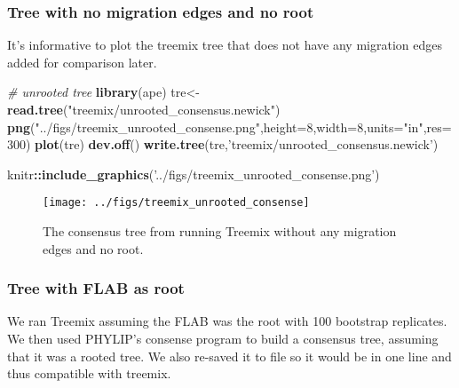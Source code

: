 \documentclass[11pt,]{article}
\newenvironment{Shaded}{\begin{snugshade}}{\end{snugshade}}
\newcommand{\KeywordTok}[1]{\textcolor[rgb]{0.13,0.29,0.53}{\textbf{#1}}}
\newcommand{\DataTypeTok}[1]{\textcolor[rgb]{0.13,0.29,0.53}{#1}}
\newcommand{\DecValTok}[1]{\textcolor[rgb]{0.00,0.00,0.81}{#1}}
\newcommand{\StringTok}[1]{\textcolor[rgb]{0.31,0.60,0.02}{#1}}
\newcommand{\CommentTok}[1]{\textcolor[rgb]{0.56,0.35,0.01}{\textit{#1}}}
\newcommand{\OperatorTok}[1]{\textcolor[rgb]{0.81,0.36,0.00}{\textbf{#1}}}
\newcommand{\NormalTok}[1]{#1}
\begin{document}
\subsubsection{Tree with no migration edges and no
root}\label{tree-with-no-migration-edges-and-no-root}

It's informative to plot the treemix tree that does not have any
migration edges added for comparison later.

\begin{Shaded}
\begin{Highlighting}[]
\CommentTok{# unrooted tree}
\KeywordTok{library}\NormalTok{(ape)}
\NormalTok{tre<-}\KeywordTok{read.tree}\NormalTok{(}\StringTok{"treemix/unrooted_consensus.newick"}\NormalTok{)}
\KeywordTok{png}\NormalTok{(}\StringTok{"../figs/treemix_unrooted_consense.png"}\NormalTok{,}\DataTypeTok{height=}\DecValTok{8}\NormalTok{,}\DataTypeTok{width=}\DecValTok{8}\NormalTok{,}\DataTypeTok{units=}\StringTok{"in"}\NormalTok{,}\DataTypeTok{res=}\DecValTok{300}\NormalTok{)}
\KeywordTok{plot}\NormalTok{(tre)}
\KeywordTok{dev.off}\NormalTok{()}
\KeywordTok{write.tree}\NormalTok{(tre,}\StringTok{'treemix/unrooted_consensus.newick'}\NormalTok{)}
\end{Highlighting}
\end{Shaded}

\begin{Shaded}
\begin{Highlighting}[]
\NormalTok{knitr}\OperatorTok{::}\KeywordTok{include_graphics}\NormalTok{(}\StringTok{'../figs/treemix_unrooted_consense.png'}\NormalTok{)}
\end{Highlighting}
\end{Shaded}

\begin{figure}[H]
\texttt{[image: ../figs/treemix\_unrooted\_consense]} \caption{The consensus tree from running Treemix without any migration edges  and no root.}\label{fig:treemixUnrooted}
\end{figure}

\subsubsection{Tree with FLAB as root}\label{tree-with-flab-as-root}

We ran Treemix assuming the FLAB was the root with 100 bootstrap
replicates. We then used PHYLIP's consense program to build a consensus
tree, assuming that it was a rooted tree. We also re-saved it to file so
it would be in one line and thus compatible with treemix.
\end{document}
